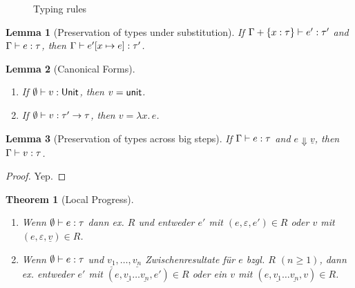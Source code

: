 \documentclass[12pt,a2paper,draft]{article}
\newcommand{\abstr}[2]{\ensuremath{\lambda{#1}.\,{#2}}}
\newcommand{\app}[2]{\ensuremath{{#1}\,{#2}}}
\newcommand{\rec}[2]{\ensuremath{{\normalfont\textsf{rec}}\,{#1}.\,{#2}}}
\newcommand{\unit}{\ensuremath{\normalfont\textsf{unit}}}
\newcommand{\Unit}{\ensuremath{\normalfont\textsf{Unit}}}
\newcommand{\Tj}[3]{\mbox{\ensuremath{{#1}\vdash{#2}:{#3}}}}
\newcommand{\tj}[2]{\Tj{\emptyset}{#1}{#2}}
\newtheorem{lemma}{Lemma}
\newtheorem{theorem}{Theorem}
\begin{document}
\begin{figure}[htb]
  \centering
  \caption{Typing rules}
  \label{fig:Typing_rules}
\end{figure}

\begin{lemma}[Preservation of types under substitution] \label{lemma:Preservation_of_types_under_substitution}
  If $\Tj{\Gamma + \{x:\tau\}}{e'}{\tau'}$ and $\Tj{\Gamma}{e}{\tau}$,
  then $\Tj{\Gamma}{e'[x \mapsto e]}{\tau'}$.
\end{lemma}

\begin{lemma}[Canonical Forms] \label{lemma:Canonical_Forms} \
  \begin{enumerate}
  \item If $\tj{v}{\Unit}$, then $v = \unit$.
  \item If $\tj{v}{\tau' \to \tau}$, then $v = \abstr{x}{e}$.
  \end{enumerate}
\end{lemma}

\begin{lemma}[Preservation of types across big steps] \label{lemma:Preservation_of_types_across_big_steps}
  If $\Tj{\Gamma}{e}{\tau}$ and $e \Downarrow \underline{v}$, then $\Tj{\Gamma}{v}{\tau}$.
\end{lemma}

\begin{proof}
  Yep.
\end{proof}

\begin{theorem}[Local Progress] \
  \begin{enumerate}
  \item Wenn $\tj{e}{\tau}$ dann ex. $R$ und entweder $e'$ mit $(e,\varepsilon,e') \in R$
    oder $v$ mit $(e,\varepsilon,\underline{v}) \in R$.
  \item Wenn $\tj{e}{\tau}$ und $\underline{v_1},\ldots,\underline{v_n}$ Zwischenresultate
    f\"ur $e$ bzgl. $R$ $(n \ge 1)$, dann ex. entweder $e'$ mit $(e,\underline{v_1}\ldots\underline{v_n},e') \in R$
    oder ein $v$ mit $(e,\underline{v_1}\ldots\underline{v_n},v) \in R$.
  \end{enumerate}
\end{theorem}
\end{document}
